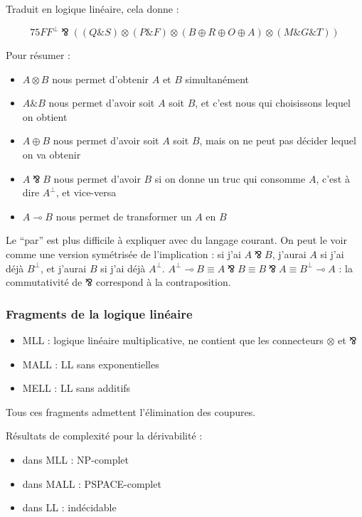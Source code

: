 \documentclass[a4paper, 11pt]{article}
\newcommand{\avec}{\mathbin{\&}}
\newcommand{\parr}{\mathbin{⅋}}
\begin{document}
Traduit en logique linéaire, cela donne :

$$75 FF^{\bot} \parr ((Q \avec S) \otimes (P \avec F) \otimes (B \oplus R \oplus O \oplus A) \otimes (M \avec G \avec T))$$ 

Pour résumer :
\begin{itemize}
    \item $A \otimes B$ nous permet d'obtenir $A$ et $B$ simultanément
    \item $A \avec B$ nous permet d'avoir soit $A$ soit $B$, et c'est nous qui choisissons lequel on obtient
    \item $A \oplus B$ nous permet d'avoir soit $A$ soit $B$, mais on ne peut pas décider lequel on va obtenir
    \item $A \parr B$ nous permet d'avoir $B$ si on donne un truc qui consomme $A$, c'est à dire $A^{\bot}$, et vice-versa
    \item $A \multimap B$ nous permet de transformer un $A$ en $B$
\end{itemize}

Le \enquote{par} est plus difficile à expliquer avec du langage courant. On peut le voir comme une version symétrisée de l'implication : si j'ai $A \parr B$, j'aurai $A$ si j'ai déjà $B^\perp$, et j'aurai $B$ si j'ai déjà $A^\perp$. $A^\perp \multimap B \equiv A \parr B \equiv B \parr A \equiv B^\perp \multimap A$ : la commutativité de $\parr$ correspond à la contraposition.

\subsubsection{Fragments de la logique linéaire}

\begin{itemize}
\item MLL : logique linéaire multiplicative, ne contient que les connecteurs $\otimes$ et $\parr$
\item MALL : LL sans exponentielles
\item MELL : LL sans additifs
\end{itemize}
Tous ces fragments admettent l'élimination des coupures.

Résultats de complexité pour la dérivabilité :
\begin{itemize}
\item dans MLL : NP-complet
\item dans MALL : PSPACE-complet
\item dans LL : indécidable %
\end{itemize}
\end{document}
